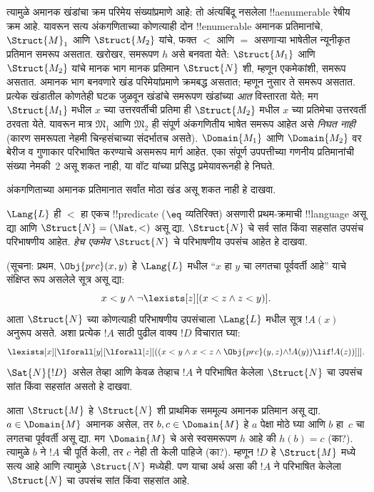 \documentclass[../../../include/open-logic-section]{subfiles}
\begin{document}
त्यामुळे अमानक खंडांचा क्रम परिमेय संख्यांप्रमाणे
आहे: तो अंत्यबिंदू नसलेला !!a{enumerable} रेषीय क्रम आहे.
यावरून सत्य अंकगणिताच्या कोणत्याही दोन
!!{enumerable} अमानक प्रतिमानांचे,
$\Struct{M}_1$ आणि $\Struct{M_2}$ यांचे,
फक्त $<$ आणि $=$ असणाऱ्या भाषेतील
न्यूनीकृत प्रतिमान समरूप असतात.
खरोखर, समरूपण $h$ असे बनवता येते:
$\Struct{M_1}$ आणि $\Struct{M_2}$ यांचे
मानक भाग मानक प्रतिमान $\Struct{N}$ शी,
म्हणून एकमेकांशी, समरूप असतात. अमानक भाग
बनवणारे खंड परिमेयांप्रमाणे क्रमबद्ध असतात;
म्हणून  नुसार ते
समरूप असतात. प्रत्येक खंडातील कोणतेही
घटक जुळवून खंडांचे समरूपण खंडांच्या
\emph{आत} विस्तारता येते; मग
$\Struct{M_1}$ मधील $x$ च्या उत्तरवर्तीची
प्रतिमा ही $\Struct{M_2}$ मधील $x$ च्या
प्रतिमेचा उत्तरवर्ती ठरवता येते.
यावरून मात्र $\mathfrak{M}_1$ आणि
$\mathfrak{M}_2$ ही संपूर्ण अंकगणितीय
भाषेत समरूप आहेत असे \emph{निघत नाही}
(कारण समरूपता नेहमी चिन्हसंचाच्या संदर्भातच
असते). $\Domain{M_1}$ आणि $\Domain{M_2}$
वर बेरीज व गुणाकार परिभाषित करण्याचे
असमरूप मार्ग आहेत. एका संपूर्ण उपपत्तीच्या
गणनीय प्रतिमानांची संख्या नेमकी~2
असू शकत नाही, या वॉट यांच्या प्रसिद्ध
प्रमेयावरूनही हे निघते.

\begin{prob}
अंकगणिताच्या अमानक प्रतिमानात सर्वांत मोठा
खंड असू शकत नाही हे दाखवा.
\end{prob}

\begin{prob}
$\Lang{L}$ ही $<$ हा एकच !!{predicate}
($\eq$ व्यतिरिक्त) असणारी प्रथम-क्रमाची
!!{language} असू द्या आणि
$\Struct{N} = (\Nat, <)$ असू द्या.
$\Struct{N}$ चे सर्व सांत किंवा सहसांत
उपसंच परिभाषणीय आहेत. \emph{हेच एकमेव}
$\Struct{N}$ चे परिभाषणीय उपसंच आहेत हे दाखवा.

(सूचना: प्रथम, $\Obj{prc}(x,y)$ हे
$\Lang{L}$ मधील “$x$ हा $y$ चा लगतचा
पूर्ववर्ती आहे” याचे संक्षिप्त रूप असलेले
सूत्र असू द्या:
\[
x<y \land \lnot \lexists[z][(x<z \land z < y)].
\]
आता $\Struct{N}$ च्या कोणत्याही परिभाषणीय
उपसंचाला $\Lang{L}$ मधील सूत्र $!A(x)$
अनुरूप असते. अशा प्रत्येक $!A$ साठी
पुढील वाक्य $!D$ विचारात घ्या:
\[
\lexists[x][\lforall[y][\lforall[z][((x<y \land x<z \land \Obj{prc}(y,z)
  \land !A(y)) \lif !A(z))]]].
\]
$\Sat{N}{!D}$ असेल तेव्हा आणि केवळ
तेव्हाच $!A$ ने परिभाषित केलेला
$\Struct{N}$ चा उपसंच सांत किंवा
सहसांत असतो हे दाखवा.

आता $\Struct{M}$ हे $\Struct{N}$
शी प्राथमिक सममूल्य अमानक प्रतिमान असू द्या.
$a \in \Domain{M}$ अमानक असेल, तर
$b, c \in \Domain{M}$ हे $a$ पेक्षा
मोठे घ्या आणि $b$ हा~$c$ चा लगतचा
पूर्ववर्ती असू द्या. मग $\Domain{M}$
चे असे स्वसमरूपण $h$ आहे की $h(b)=c$
(का?). त्यामुळे $b$ ने $!A$ ची पूर्ति
केली, तर $c$ नेही ती केली पाहिजे (का?).
म्हणून $!D$ हे $\Struct{M}$ मध्ये सत्य
आहे आणि त्यामुळे $\Struct{N}$ मध्येही.
पण याचा अर्थ असा की $!A$ ने परिभाषित
केलेला $\Struct{N}$ चा उपसंच सांत
किंवा सहसांत आहे.
\end{prob}
\end{document}
